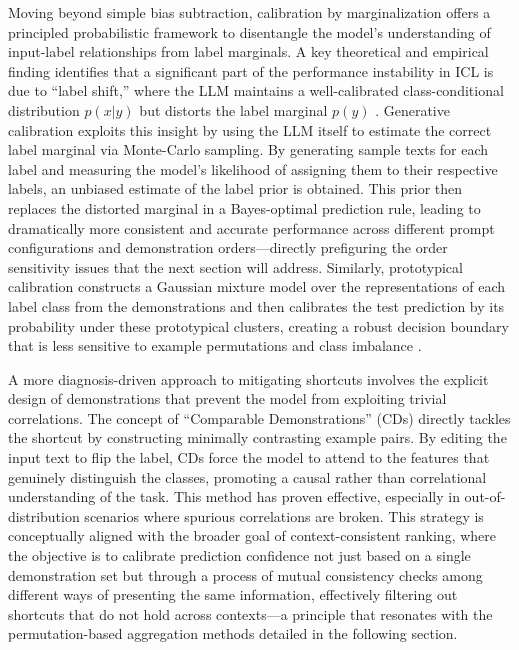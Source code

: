 \documentclass[11pt]{article}
\begin{document}
Moving beyond simple bias subtraction, calibration by marginalization offers a principled probabilistic framework to disentangle the model's understanding of input-label relationships from label marginals. A key theoretical and empirical finding identifies that a significant part of the performance instability in ICL is due to ``label shift,'' where the LLM maintains a well-calibrated class-conditional distribution \(p(x|y)\) but distorts the label marginal \(p(y)\) \cite{ref179}. Generative calibration exploits this insight by using the LLM itself to estimate the correct label marginal via Monte-Carlo sampling. By generating sample texts for each label and measuring the model's likelihood of assigning them to their respective labels, an unbiased estimate of the label prior is obtained. This prior then replaces the distorted marginal in a Bayes-optimal prediction rule, leading to dramatically more consistent and accurate performance across different prompt configurations and demonstration orders---directly prefiguring the order sensitivity issues that the next section will address. Similarly, prototypical calibration constructs a Gaussian mixture model over the representations of each label class from the demonstrations and then calibrates the test prediction by its probability under these prototypical clusters, creating a robust decision boundary that is less sensitive to example permutations and class imbalance \cite{ref131}.

A more diagnosis-driven approach to mitigating shortcuts involves the explicit design of demonstrations that prevent the model from exploiting trivial correlations. The concept of ``Comparable Demonstrations'' (CDs) \cite{ref8} directly tackles the shortcut by constructing minimally contrasting example pairs. By editing the input text to flip the label, CDs force the model to attend to the features that genuinely distinguish the classes, promoting a causal rather than correlational understanding of the task. This method has proven effective, especially in out-of-distribution scenarios where spurious correlations are broken. This strategy is conceptually aligned with the broader goal of context-consistent ranking, where the objective is to calibrate prediction confidence not just based on a single demonstration set but through a process of mutual consistency checks among different ways of presenting the same information, effectively filtering out shortcuts that do not hold across contexts---a principle that resonates with the permutation-based aggregation methods detailed in the following section.
\end{document}
